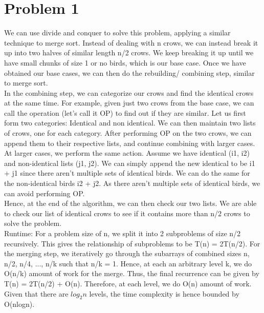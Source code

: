 \documentclass[12pt,letterpaper]{article}
\begin{document}
\newpage

\section*{Problem 1}

We can use divide and conquer to solve this problem, applying a similar technique to merge sort.
Instead of dealing with n crows, we can instead break it up into two halves of similar length n/2 crows. 
We keep breaking it up until we have small chunks of size 1 or no birds, which is our base case.
Once we have obtained our base cases, we can then do the rebuilding/ combining step, similar to merge sort. \\

In the combining step, we can categorize our crows and find the identical crows at the same time.
For example, given just two crows from the base case, we can call the operation (let's call it OP) to find out if they are similar.
Let us first form two categories: Identical and non identical.
We can then maintain two lists of crows, one for each category.
After performing OP on the two crows, 
we can append them to their respective lists, and continue combining with larger cases. 
At larger cases, we perform the same action. 
Assume we have identical (i1, i2) and non-identical lists (j1, j2).
We can simply append the new identical to be i1 + j1 since there aren't multiple sets of identical birds.
We can do the same for the non-identical birds i2 + j2.
As there aren't multiple sets of identical birds, we can avoid performing OP.
\\

Hence, at the end of the algorithm, we can then check our two lists.
We are able to check our list of identical crows to see if it
contains more than n/2 crows to solve the problem. \\

Runtime: 
For a problem size of n, we split it into 2 subproblems of size n/2 recursively. 
This gives the relationship of subproblems to be T(n) = 2T(n/2).
For the merging step, we iteratively go through the subarrays of combined sizes n, n/2, n/4, ..., n/k such that n/k = 1.
Hence, at each an arbitrary level k, we do O(n/k) amount of work for the merge. 
Thus, the final recurrence can be given by T(n) = 2T(n/2) + O(n). 
Therefore, at each level, we do O(n) amount of work.
Given that there are $log_2 n$ levels, the time complexity is hence bounded by O(nlogn).

\newpage
\end{document}
